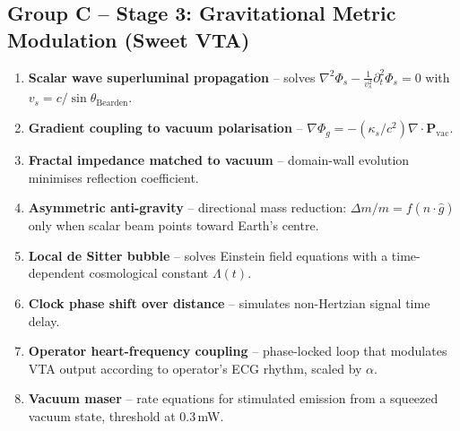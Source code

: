 \documentclass[11pt]{article}
\begin{document}
\subsection{Group C -- Stage 3: Gravitational Metric Modulation (Sweet VTA)}
\begin{enumerate}[nosep,start=17]
    \item \textbf{Scalar wave superluminal propagation} -- solves $\nabla^2\Phi_s - \frac{1}{v_s^2}\partial_t^2\Phi_s = 0$ with $v_s = c/\sin\theta_{\text{Bearden}}$.
    \item \textbf{Gradient coupling to vacuum polarisation} -- $\nabla\Phi_g = -(\kappa_s/c^2)\nabla\cdot\mathbf{P}_{\text{vac}}$.
    \item \textbf{Fractal impedance matched to vacuum} -- domain-wall evolution minimises reflection coefficient.
    \item \textbf{Asymmetric anti-gravity} -- directional mass reduction: $\Delta m/m = f(\hat{n}\cdot\hat{g})$ only when scalar beam points toward Earth's centre.
    \item \textbf{Local de Sitter bubble} -- solves Einstein field equations with a time-dependent cosmological constant $\Lambda(t)$.
    \item \textbf{Clock phase shift over distance} -- simulates non-Hertzian signal time delay.
    \item \textbf{Operator heart-frequency coupling} -- phase-locked loop that modulates VTA output according to operator's ECG rhythm, scaled by $\alpha$.
    \item \textbf{Vacuum maser} -- rate equations for stimulated emission from a squeezed vacuum state, threshold at 0.3\,mW.
\end{enumerate}
\end{document}

